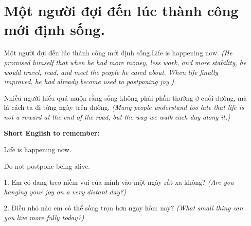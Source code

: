 \section{Một người đợi đến lúc thành công mới định sống.}
\begin{truyen}{Một người đợi đến lúc thành công mới định sống.}{Life is happening now.}
\textit{(He promised himself that when he had more money, less work, and more stability, he would travel, read, and meet the people he cared about. When life finally improved, he had already become used to postponing joy.)}
\end{truyen}
\begin{baihoc}
Nhiều người hiểu quá muộn rằng sống không phải phần thưởng ở cuối đường, mà là cách ta đi từng ngày trên đường.
\textit{(Many people understand too late that life is not a reward at the end of the road, but the way we walk each day along it.)}
\end{baihoc}
\begin{ghinhoanh}
\textbf{Short English to remember:}

Life is happening now.

Do not postpone being alive.
\end{ghinhoanh}
\begin{tuhocnhanh}
1. Em có đang treo niềm vui của mình vào một ngày rất xa không? \textit{(Are you hanging your joy on a very distant day?)}

2. Điều nhỏ nào em có thể sống trọn hơn ngay hôm nay? \textit{(What small thing can you live more fully today?)}
\end{tuhocnhanh}
\ngancach